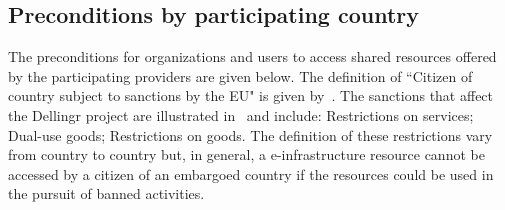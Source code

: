 \documentclass{article}
\newcommand{\dell}{Dellingr\xspace}
\newcommand{\einfra}{e-infrastructure\xspace}
\begin{document}
\subsection{Preconditions by participating country}
\label{sec-precond}

The preconditions for organizations and users to access shared resources
offered by the participating providers are given below.
The definition of ``Citizen of country subject to sanctions by the EU" is given by~\cite{eu-sanctions}.
The sanctions that affect the \dell project are illustrated in~\cite{eu-sanctions-guide} and include: Restrictions on services; Dual-use goods; Restrictions on goods.
The definition of these restrictions vary from country to country but, in general, a \einfra resource cannot be accessed by a citizen of an embargoed country if the resources could be used in the pursuit of banned activities.
\end{document}
